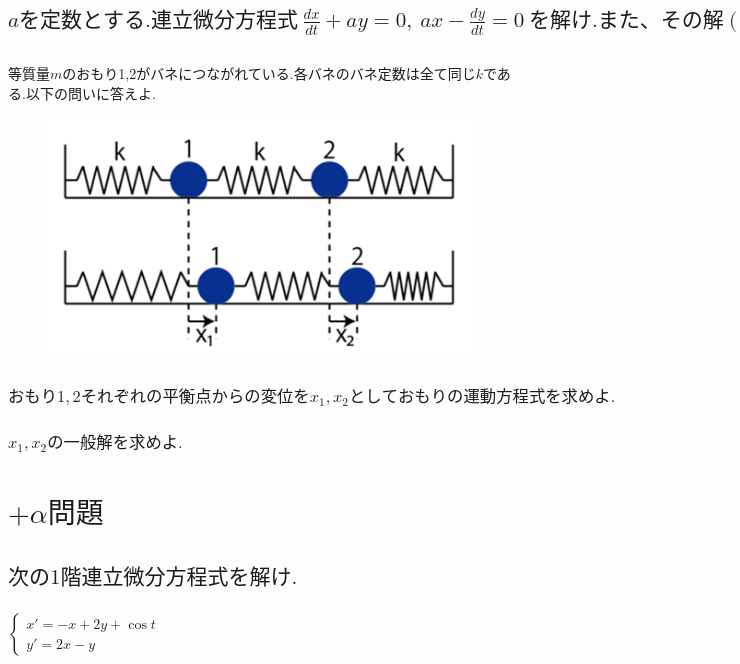 \documentclass[a4paper,11pt,fleqn]{jarticle}
\begin{document}
\newpage
\subsection{$aを定数とする.連立微分方程式~\frac{dx}{dt}+ay=0,~ax-\frac{dy}{dt}=0~を解け.また、その解(x,y)はどんな図形を描くか.$}

\newpage
\subsection{}
等質量$m$のおもり1,2がバネにつながれている.各バネのバネ定数は全て同じ$k$である.以下の問いに答えよ.
\begin{figure}[htpb]
\begin{center}
\includegraphics[scale=.20]{bane.png}
\end{center}
\end{figure}
\subsubsection{$おもり1,2それぞれの平衡点からの変位をx_1,x_2としておもりの運動方程式を求めよ.$}
\subsubsection{$x_1,x_2の一般解を求めよ.$}


\newpage
\section*{$+\alpha 問題$}
\subsection{$次の1階連立微分方程式を解け.$}
\subsubsection{}
$\left\{ \begin{array}{l}
x'=-x+2y+\cos t \\
y'=2x-y
\end{array} \right.$
\end{document}
